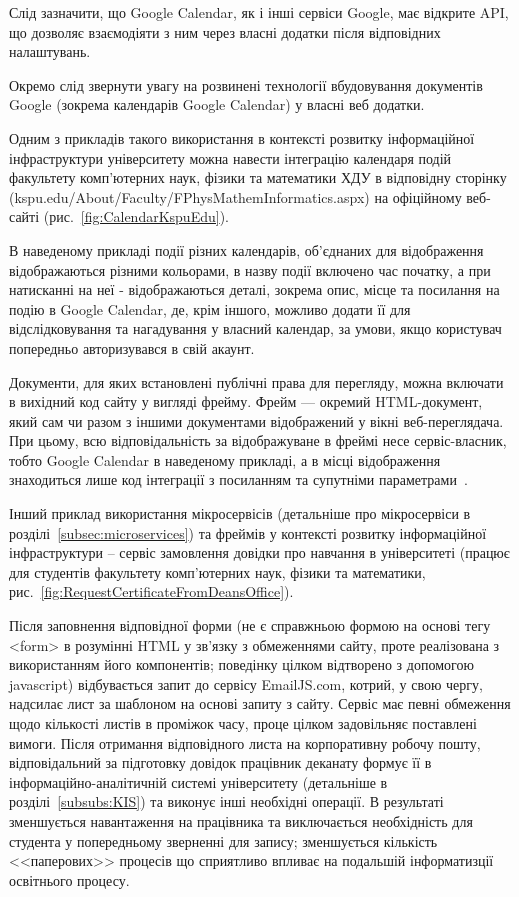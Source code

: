Слід зазначити, що Google Calendar, як і інші сервіси Google, має відкрите API, що дозволяє взаємодіяти з ним через власні додатки після відповідних налаштувань.

Окремо слід звернути увагу на розвинені технології вбудовування документів Google (зокрема календарів Google Calendar) у власні веб додатки. 

Одним з прикладів такого використання в контексті розвитку інформаційної інфраструктури університету можна навести інтеграцію календаря подій факультету комп'ютерних наук, фізики та математики ХДУ в відповідну сторінку (kspu.edu/About/Faculty/FPhysMathemInformatics.aspx) на офіційному веб-сайті (рис.~\ref{fig:CalendarKspuEdu}).


В наведеному прикладі події різних календарів, об'єднаних для відображення відображаються різними кольорами, в назву події включено час початку, а при натисканні на неї - відображаються деталі, зокрема опис, місце та посилання на подію в Google Calendar, де, крім іншого, можливо додати її для відслідковування та нагадування у власний календар, за умови, якщо користувач попередньо авторизувався в свій акаунт.

Документи, для яких встановлені публічні права для перегляду, можна включати в вихідний код сайту у вигляді фрейму. Фрейм — окремий HTML-документ, який сам чи разом з іншими документами відображений у вікні веб-переглядача. При цьому, всю відповідальність за відображуване в фреймі несе сервіс-власник, тобто Google Calendar в наведеному прикладі, а в місці відображення знаходиться лише код інтеграції з посиланням та супутніми параметрами~\cite{ліщина2014проблеми}.

Інший приклад використання мікросервісів (детальніше про мікросервіси в розділі~\ref{subsec:microservices}) та фреймів у контексті розвитку інформаційної інфраструктури  -- сервіс замовлення довідки про навчання в університеті (працює для студентів факультету комп'ютерних наук, фізики та математики, рис.~\ref{fig:RequestCertificateFromDeansOffice}).


Після заповнення відповідної форми (не є справжньою формою на основі тегу <form> в розумінні HTML у зв'язку з обмеженнями сайту, проте реалізована з використанням його компонентів; поведінку цілком відтворено з допомогою javascript) відбувається запит до сервісу EmailJS.com, котрий, у свою чергу, надсилає лист за шаблоном на основі запиту з сайту. Сервіс має певні обмеження щодо кількості листів в проміжок часу, проце цілком задовільняє поставлені вимоги. Після отримання відповідного листа на корпоративну робочу пошту, відповідальний за підготовку довідок працівник деканату формує її в інформаційно-аналітичній системі університету  (детальніше в розділі~\ref{subsubs:KIS}) та виконує інші необхідні операції. В результаті зменшується навантаження на працівника та виключається необхідність  для студента у попередньому зверненні для запису; зменшується кількість <<паперових>> процесів що сприятливо впливає на подальшій інформатизції освітнього процесу.

